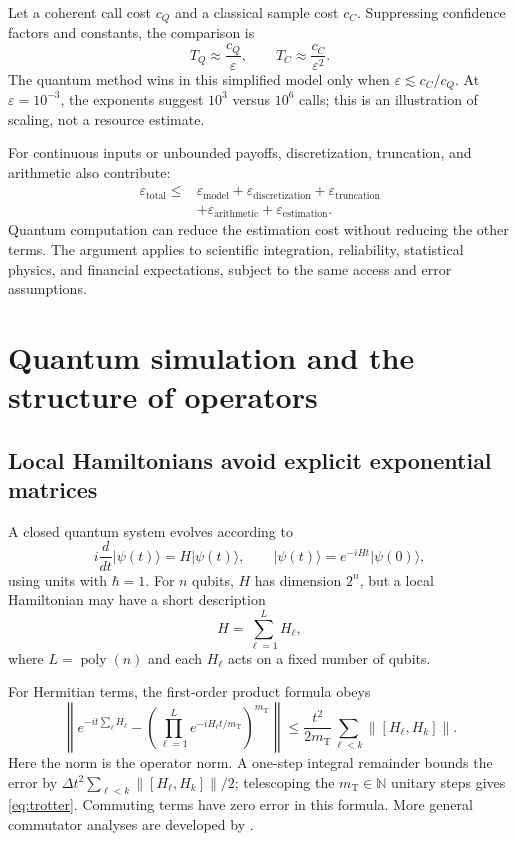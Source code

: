 \documentclass[11pt,a4paper]{article}
\newcommand{\ket}[1]{\lvert #1\rangle}
\newcommand{\norm}[1]{\left\lVert #1\right\rVert}
\newcommand{\poly}{\operatorname{poly}}
\newcommand{\nT}{m_{\mathrm{T}}}
\theoremstyle{definition}
\theoremstyle{remark}
\numberwithin{equation}{section}
\begin{document}
Let a coherent call cost $c_Q$ and a classical sample cost $c_C$.
Suppressing confidence factors and constants, the comparison is
\begin{equation}
 T_Q\approx \frac{c_Q}{\varepsilon},\qquad
 T_C\approx \frac{c_C}{\varepsilon^2}.
\end{equation}
The quantum method wins in this simplified model only when
$\varepsilon\lesssim c_C/c_Q$. At $\varepsilon=10^{-3}$, the exponents
suggest $10^3$ versus $10^6$ calls; this is an illustration of scaling,
not a resource estimate.

For continuous inputs or unbounded payoffs, discretization, truncation, and
arithmetic also contribute:
\begin{equation}\label{eq:errorbudget}
 \begin{split}
 \varepsilon_{\mathrm{total}}\leq&
 \varepsilon_{\mathrm{model}}+\varepsilon_{\mathrm{discretization}}
 +\varepsilon_{\mathrm{truncation}}\\
 &+\varepsilon_{\mathrm{arithmetic}}+\varepsilon_{\mathrm{estimation}}.
 \end{split}
\end{equation}
Quantum computation can reduce the estimation cost without reducing the
other terms. The argument applies to scientific integration, reliability,
statistical physics, and financial expectations, subject to the same
access and error assumptions.

\section{Quantum simulation and the structure of operators}\label{sec:simulation}
\subsection{Local Hamiltonians avoid explicit exponential matrices}
A closed quantum system evolves according to
\begin{equation}
 i\frac{d}{dt}\ket{\psi(t)}=H\ket{\psi(t)},\qquad
 \ket{\psi(t)}=e^{-iHt}\ket{\psi(0)},
\end{equation}
using units with $\hbar=1$. For $n$ qubits, $H$ has dimension $2^n$, but
a local Hamiltonian may have a short description
\begin{equation}
 H=\sum_{\ell=1}^L H_\ell,
\end{equation}
where $L=\poly(n)$ and each $H_\ell$ acts on a fixed number of qubits.

For Hermitian terms, the first-order product formula obeys
\begin{equation}\label{eq:trotter}
 \left\|e^{-it\sum_\ell H_\ell}
 -\left(\prod_{\ell=1}^L e^{-iH_\ell t/{\nT}}\right)^{\nT}\right\|
 \leq \frac{t^2}{2{\nT}}\sum_{\ell<k}\norm{[H_\ell,H_k]}.
\end{equation}
Here the norm is the operator norm. A one-step integral remainder bounds
the error by $\Delta t^2\sum_{\ell<k}\|[H_\ell,H_k]\|/2$;
telescoping the ${\nT}\in\mathbb N$ unitary steps gives \eqref{eq:trotter}.
Commuting terms have zero error in this formula. More general commutator
analyses are developed by \citet{childs2021}.
\end{document}
